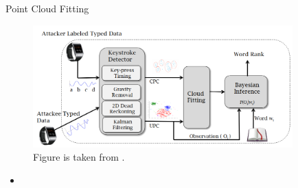 \documentclass[ucs,9pt]{beamer}
\begin{document}
\begin{frame}{Point Cloud Fitting}
	\begin{figure}
		\centering
		\includegraphics[width=10cm]{imgs/moleOverview}
		\caption{Figure is taken from \cite{b1}.}
	\end{figure}
	\begin{itemize}
		\item 
	\end{itemize}
\end{frame}
\end{document}
